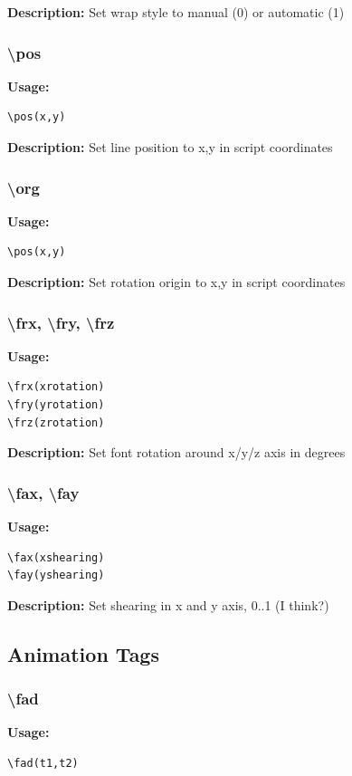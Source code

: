 \documentclass{spec}
\begin{document}
\textbf{Description:}
Set wrap style to manual (0) or automatic (1)

\subsubsection{\textbackslash pos}
\textbf{Usage:}
\begin{verbatim}
\pos(x,y)
\end{verbatim}

\textbf{Description:}
Set line position to x,y in script coordinates

\subsubsection{\textbackslash org}
\textbf{Usage:}
\begin{verbatim}
\pos(x,y)
\end{verbatim}

\textbf{Description:}
Set rotation origin to x,y in script coordinates

\subsubsection{\textbackslash frx, \textbackslash fry, \textbackslash frz}
\textbf{Usage:}
\begin{verbatim}
\frx(xrotation)
\fry(yrotation)
\frz(zrotation)
\end{verbatim}

\textbf{Description:}
Set font rotation around x/y/z axis in degrees

\subsubsection{\textbackslash fax, \textbackslash fay}
\textbf{Usage:}
\begin{verbatim}
\fax(xshearing)
\fay(yshearing)
\end{verbatim}

\textbf{Description:}
Set shearing in x and y axis, 0..1 (I think?)

\subsection{Animation Tags}

\subsubsection{\textbackslash fad}
\textbf{Usage:}
\begin{verbatim}
\fad(t1,t2)
\end{verbatim}
\end{document}
